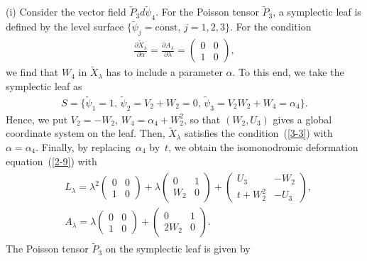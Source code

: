 \documentclass[10pt,a4paper]{amsart}
\numberwithin{equation}{section}
\begin{document}
(i) Consider the vector f\/ield $\widetilde{P}_3 d\widetilde{\psi}_4$. For the Poisson tensor $\widetilde{P}_3$, a symplectic leaf is def\/ined by the level surface $\{ \widetilde{\psi}_j = \text{const},\, j=1,2,3\}$. For the condition
\begin{gather}
\frac{\partial \widetilde{X}_\lambda }{\partial \alpha } = \frac{\partial A_\lambda }{\partial \lambda } = \left(
\begin{matrix}
0 & 0 \\
1 & 0
\end{matrix}
\right),
\label{3-3}
\end{gather}
we  f\/ind that $W_4$ in $\widetilde{X}_\lambda $ has to include a parameter $\alpha $. To this end, we take the symplectic leaf as
\begin{gather*}
S = \big\{ \widetilde{\psi}_1 = 1,\, \widetilde{\psi}_2 = V_2 + W_2 = 0 ,\, \widetilde{\psi}_3 = V_2W_2 + W_4 = \alpha _4 \big\}.
\end{gather*}
Hence, we put $V_2 = -W_2$, $W_4 = \alpha _4 + W_2^2$, so that $(W_2, U_3)$ gives a global coordinate system on the leaf. Then, $\widetilde{X}_\lambda $ satisf\/ies the condition~(\ref{3-3}) with $\alpha =\alpha _4$. Finally, by replacing~$\alpha _4$ by~$t$, we obtain the isomonodromic deformation equation~(\ref{2-9}) with
\begin{gather*}
\begin{split}
& L_\lambda = \lambda ^2 \left(
\begin{matrix}
0 & 0 \\
1 & 0
\end{matrix}
\right) + \lambda \left(
\begin{matrix}
0 & 1 \\
W_2 & 0
\end{matrix}
\right) + \left(
\begin{matrix}
U_3 & -W_2 \\
t + W_2^2 & -U_3
\end{matrix}
\right), \\
& A_\lambda = \lambda \left(
\begin{matrix}
0 & 0 \\
1 & 0
\end{matrix}
\right) + \left(
\begin{matrix}
0 & 1 \\
2W_2 & 0
\end{matrix}
\right) .
\end{split}
\end{gather*}
The Poisson tensor $\widetilde{P}_3$ on the symplectic leaf is given by
\end{document}
